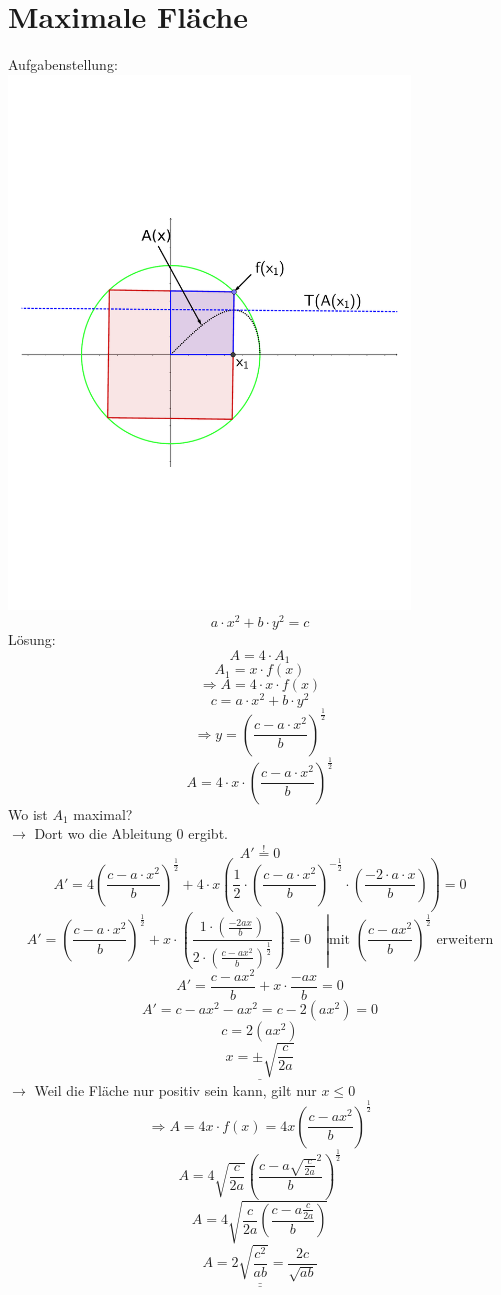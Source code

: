 \section{Maximale Fläche}
Aufgabenstellung: \\
\includegraphics[width=0.8\textwidth]{bilder/maximale_flaeche.pdf}
\[a \cdot x^2 + b \cdot y^2 = c\]
Lösung:
\[A = 4 \cdot A_1\]
\[A_1 = x \cdot f(x)\]
\[\Rightarrow A = 4 \cdot x \cdot f(x)\]
\[c = a \cdot x^2 + b \cdot y^2\]
\[\Rightarrow y = \left( \frac{c - a \cdot x^2}{b} \right)^{\frac{1}{2}}\]
\[A = 4 \cdot x \cdot \left( \frac{c - a \cdot x^2}{b} \right)^{\frac{1}{2}}\]
Wo ist $A_1$ maximal? \\
$\rightarrow$ Dort wo die Ableitung $0$ ergibt. 
\[A' \stackrel{!}{=} 0\]
\[A' = 4 \left(\frac{c - a \cdot x^2}{b}\right)^\frac{1}{2} + 4 \cdot x \left(\frac{1}{2} \cdot \left(\frac{c - a \cdot x^2}{b}\right)^{-\frac{1}{2}} \cdot \left(\frac{-2 \cdot a \cdot x}{b}\right)\right) = 0\]
\[A' = \left(\frac{c - a \cdot x^2}{b}\right)^{\frac{1}{2}} + x \cdot \left(\frac{1 \cdot \left(\frac{-2ax}{b}\right)}{2 \cdot \left(\frac{c - ax^2}{b}\right)^{\frac{1}{2}}}\right) = 0\quad \left|\text{mit }\left(\frac{c - ax^2}{b}\right)^{\frac{1}{2}} \right.\text{ erweitern}\]
\[A' = \frac{c - ax^2}{b} + x \cdot \frac{-ax}{b} = 0\]
\[A' = c - ax^2 - ax^2 = c - 2 \left(ax^2\right) = 0\]
\[c = 2 \left(ax^2\right)\]
\[\underline{x = \pm\sqrt{\frac{c}{2a}}}\]
$\rightarrow$ Weil die Fläche nur positiv sein kann, gilt nur $x \leq 0$
\[\Rightarrow A = 4 x \cdot f(x) = 4 x \left(\frac{c - ax^2}{b}\right)^{\frac{1}{2}}\]
\[A = 4 \sqrt{\frac{c}{2a}} \left(\frac{c - a \sqrt{\frac{c}{2a}}^2}{b}\right)^{\frac{1}{2}}\]
\[A = 4 \sqrt{\frac{c}{2a} \left(\frac{c - a \frac{c}{2a}}{b}\right)}\]
\[\underline{\underline{A = 2 \sqrt{\frac{c^2}{ab} } = \frac{2c}{\sqrt{ab}}}}\]
